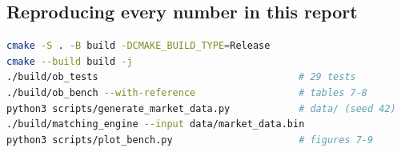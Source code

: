 \documentclass[11pt,a4paper]{article}
\begin{document}
\subsection{Reproducing every number in this report}

\begin{lstlisting}[caption={Full reproduction sequence},language=bash,
                   numbers=none]
cmake -S . -B build -DCMAKE_BUILD_TYPE=Release
cmake --build build -j
./build/ob_tests                                   # 29 tests
./build/ob_bench --with-reference                  # tables 7-8
python3 scripts/generate_market_data.py            # data/ (seed 42)
./build/matching_engine --input data/market_data.bin
python3 scripts/plot_bench.py                      # figures 7-9
\end{lstlisting}
\end{document}
